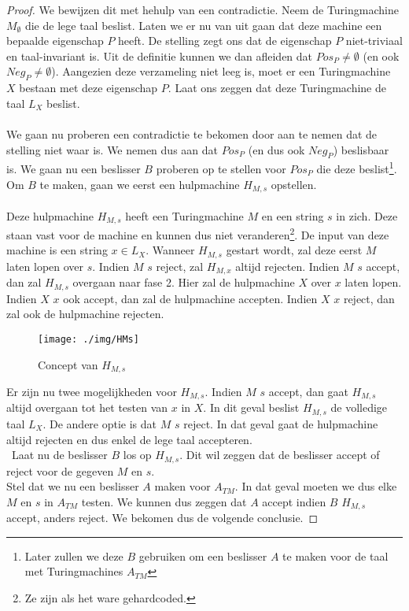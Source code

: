 \begin{proof}
	We bewijzen dit met hehulp van een contradictie. Neem de Turingmachine $M_\emptyset$ die de lege taal beslist. Laten we er nu van uit gaan dat deze machine een bepaalde eigenschap $P$ heeft. De stelling zegt ons dat de eigenschap $P$ niet-triviaal en taal-invariant is. Uit de definitie kunnen we dan afleiden dat $Pos_P \neq \emptyset$ (en ook $Neg_P \neq \emptyset$). Aangezien deze verzameling niet leeg is, moet er een Turingmachine $X$ bestaan met deze eigenschap $P$. Laat ons zeggen dat deze Turingmachine de taal $L_X$ beslist.\\\\
	We gaan nu proberen een contradictie te bekomen door aan te nemen dat de stelling niet waar is. We nemen dus aan dat $Pos_P$ (en dus ook $Neg_P$) beslisbaar is. We gaan nu een beslisser $B$ proberen op te stellen voor $Pos_P$ die deze beslist\footnote{Later zullen we deze $B$ gebruiken om een beslisser $A$ te maken voor de taal met Turingmachines $A_{TM}$}. Om $B$ te maken, gaan we eerst een hulpmachine $H_{M,s}$ opstellen.\\\\
	Deze hulpmachine $H_{M,s}$ heeft een Turingmachine $M$ en een string $s$ in zich. Deze staan vast voor de machine en kunnen dus niet veranderen\footnote{Ze zijn als het ware gehardcoded.}. De input van deze machine is een string $x \in L_X$. Wanneer $H_{M,s}$ gestart wordt, zal deze eerst $M$ laten lopen over $s$. Indien $M$ $s$ reject, zal $H_{M,x}$ altijd rejecten. Indien $M$ $s$ accept, dan zal $H_{M,s}$ overgaan naar fase 2. Hier zal de hulpmachine $X$ over $x$ laten lopen. Indien $X$ $x$ ook accept, dan zal de hulpmachine accepten. Indien $X$ $x$ reject, dan zal ook de hulpmachine rejecten.
	\begin{figure}[H]
  	\centering
    	  \texttt{[image: ./img/HMs]}
  	\caption{Concept van $H_{M,s}$}
	\end{figure}
	Er zijn nu twee mogelijkheden voor $H_{M,s}$. Indien $M$ $s$ accept, dan gaat $H_{M,s}$ altijd overgaan tot het testen van $x$ in $X$. In dit geval beslist $H_{M,s}$ de volledige taal $L_X$. De andere optie is dat $M$ $s$ reject. In dat geval gaat de hulpmachine altijd rejecten en dus enkel de lege taal accepteren.\\\
	Laat nu de beslisser $B$ los op $H_{M,s}$. Dit wil zeggen dat de beslisser accept of reject voor de gegeven $M$ en $s$.\\
	Stel dat we nu een beslisser $A$ maken voor $A_{TM}$. In dat geval moeten we dus elke $M$ en $s$ in $A_{TM}$ testen. We kunnen dus zeggen dat $A$ accept indien $B$ $H_{M,s}$ accept, anders reject. We bekomen dus de volgende conclusie.

\end{proof}
